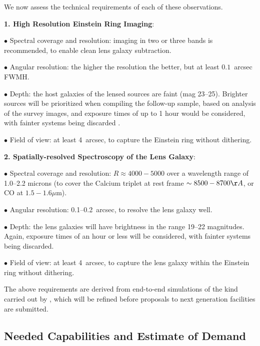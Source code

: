 We now assess the technical  requirements of each of these observations.

{\bf 1. High Resolution Einstein Ring Imaging}:

$\bullet$ Spectral coverage and resolution: imaging in two or three
bands is recommended, to enable clean lens galaxy subtraction.

$\bullet$ Angular resolution: the higher the resolution the better, but
at least $0.1$~arcsec FWMH.

$\bullet$ Depth: the host galaxies of the lensed sources are faint (mag
23--25). Brighter sources will be prioritized when compiling the
follow-up sample, based on analysis of the survey images, and exposure
times of up to 1 hour would be considered, with fainter systems being
discarded \citep{MengEtal2015}.

$\bullet$ Field of view: at least 4~arcsec, to capture the Einstein
ring without dithering.


{\bf 2. Spatially-resolved Spectroscopy of the Lens Galaxy}:

$\bullet$ Spectral coverage and resolution: $R\approx4000-5000$  over a
wavelength range of 1.0--2.2 microns (to cover the Calcium triplet at rest frame
$\sim8500-8700\AA$, or CO at $1.5-1.6\mu$m).

$\bullet$ Angular resolution: 0.1--0.2~arcsec, to resolve the lens galaxy well.

$\bullet$ Depth: the lens galaxies will have brightness in the range
19--22 magnitudes. Again, exposure times of an hour or less will be
considered, with fainter systems being discarded.

$\bullet$ Field of view: at least 4~arcsec, to capture the lens galaxy
within the Einstein ring without dithering.

The above requirements are derived from end-to-end simulations of the
kind carried out by \citet{MengEtal2015}, which will be refined before
proposals to next generation facilities are submitted.


\subsection{Needed Capabilities and Estimate of Demand}


